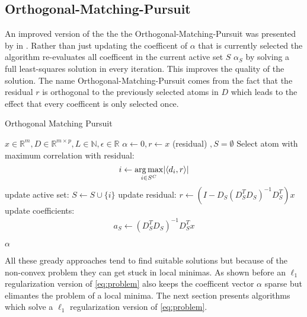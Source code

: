 \subsection{Orthogonal-Matching-Pursuit}
\label{sec:omp}

An improved version of the  the the Orthogonal-Matching-Pursuit  was presented by in \cite{Pati1993}.
Rather than just updating the coefficent of $\alpha$ that is currently selected  the algorithm re-evaluates all coefficent in the current active set $S$ 
 $\alpha_S$ by solving a full least-squares solution in every iteration. This improves the quality of the solution. \cite{OMP}
The name Orthogonal-Matching-Pursuit comes from the fact that the residual $r$ is orthogonal to the previously selected atoms in $D$ which leads to the effect that every coefficent is only selected once.



\begin{algorithm}
\caption{Orthogonal Matching Pursuit}
\label{alg:omp}
\begin{algorithmic}[1]
\REQUIRE $x \in \mathbb{R}^m, D \in \mathbb{R}^{m\times p}, L \in \mathbb{N}, \epsilon \in \mathbb{R}$
\STATE $\alpha \gets 0, r \gets x $ (residual) $, S=\emptyset$
\STATE Select atom with maximum correlation with residual: 
\begin{equation*}
i \gets \operatorname*{arg\,max}_{i \in S^C} \lvert \left<d_i,r\right> \rvert
\end{equation*}
\STATE update active set: $S \gets S \cup \{i\} $
\STATE update residual: $r \gets \left(I-D_S\left( D_S^T D_S \right)^{-1} D_S^T \right)x$
\STATE update coefficients: 
\begin{align}
a_S \gets \left( D_S^T D_S \right)^{-1} D_S^T x  \label{eq:omp_update}
\end{align}

\ENDFOR
\RETURN $\alpha$
\end{algorithmic}
\end{algorithm}


All these gready approaches tend to find suitable solutions but because of the non-convex problem they can get stuck in local minimas.
As shown before an $\ell_1$ regularization version of \ref{eq:problem} also keeps the coefficent vector $\alpha$ sparse but elimantes the problem of a local minima.
The next section presents algorithms which solve  a $\ell_1$ regularization version of \ref{eq:problem}.



